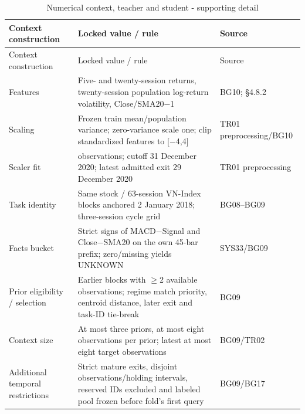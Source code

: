 \begin{longtable}[]{@{}
  >{\raggedright\arraybackslash}p{}
  >{\raggedright\arraybackslash}p{}
  >{\raggedright\arraybackslash}p{}@{}}
\caption{Numerical context, teacher and student - supporting detail}\label{tab:C_configuration:6}\tabularnewline
\toprule\noalign{}
Context construction
 & Locked value / rule
 & Source
 \\
\midrule\noalign{}
\endfirsthead
\toprule\noalign{}
Context construction
 & Locked value / rule
 & Source
 \\
\midrule\noalign{}
\endhead
\bottomrule\noalign{}
\endlastfoot
Features & Five- and twenty-session returns, twenty-session population log-return volatility, Close/SMA20\ensuremath{-}1 & BG10; §4.8.2 \\
Scaling & Frozen train mean/population variance; zero-variance scale one; clip standardized features to {[}\ensuremath{-}4,4{]} & TR01 preprocessing/BG10 \\
Scaler fit & 731 observations; cutoff 31 December 2020; latest admitted exit 29 December 2020 & TR01 preprocessing \\
Task identity & Same stock / 63-session VN-Index blocks anchored 2 January 2018; three-session cycle grid & BG08--BG09 \\
Facts bucket & Strict signs of MACD\ensuremath{-}Signal and Close\ensuremath{-}SMA20 on the own 45-bar prefix; zero/missing yields UNKNOWN & SYS33/BG09 \\
Prior eligibility / selection & Earlier blocks with \ensuremath{\geq}2 available observations; regime match priority, centroid distance, later exit and task-ID tie-break & BG09 \\
Context size & At most three priors, at most eight observations per prior; latest at most eight target observations & BG09/TR02 \\
Additional temporal restrictions & Strict mature exits, disjoint observations/holding intervals, reserved IDs excluded and labeled pool frozen before fold's first query & BG09/BG17 \\
\end{longtable}

\endgroup

\begingroup
\small
{}
\setlength{\tabcolsep}{3pt}

